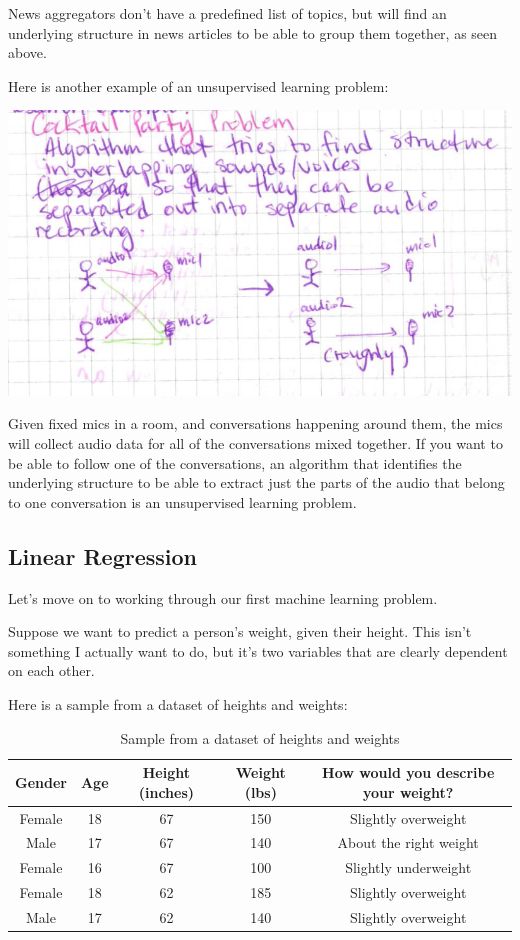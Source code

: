 \documentclass[12pt]{article}
\begin{document}
News aggregators don't have a predefined list of topics, but will find an underlying structure in news articles to be able to group them together, as seen above. 

Here is another example of an unsupervised learning problem:

\includegraphics[width={\textwidth}]{cocktail-party}

Given fixed mics in a room, and conversations happening around them, the mics will collect audio data for all of the conversations mixed together. If you want to be able to follow one of the conversations, an algorithm that identifies the underlying structure to be able to extract just the parts of the audio that belong to one conversation is an unsupervised learning problem. 

\subsection{Linear Regression}
Let's move on to working through our first machine learning problem.

Suppose we want to predict a person's weight, given their height. This isn't something I actually want to do, but it's two variables that are clearly dependent on each other.

Here is a sample from a dataset of heights and weights:
\begin{table}[htp]
\caption{Sample from a dataset of heights and weights}
\begin{center}
\begin{tabular}{|c|c|c|c|c|}
\hline
Gender & Age & Height (inches) & Weight (lbs) & How would you describe your weight? \\ \hline
Female & 18 & 67 & 150 & Slightly overweight \\
Male & 17 & 67 & 140 & About the right weight \\
Female & 16 & 67 & 100 & Slightly underweight \\
Female & 18 & 62 & 185 & Slightly overweight \\
Male & 17 & 62 & 140 & Slightly overweight \\
\hline
\end{tabular}
\end{center}
\label{Sample from a dataset of heights and weights}
\end{table}%
\end{document}
